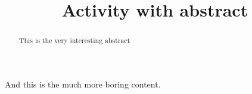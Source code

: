 \documentclass{ximera}
\begin{document}
    \title{Activity with abstract}
    \begin{abstract}
    This is the very interesting abstract
    \end{abstract}

    And this is the much more boring content.
\end{document}

